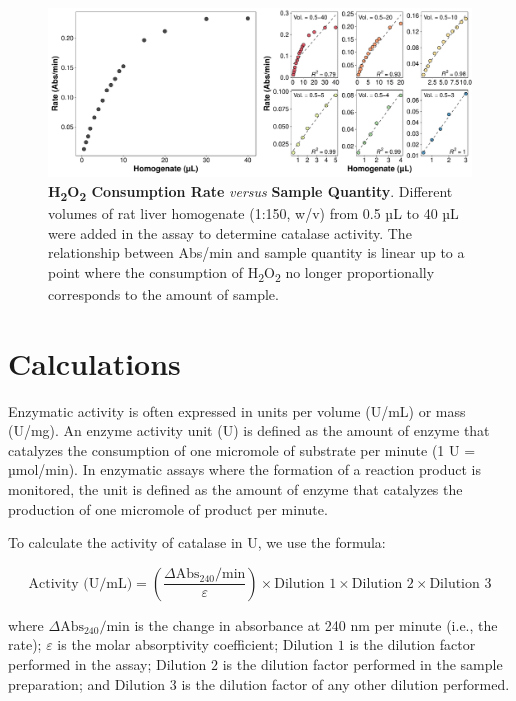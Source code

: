 \documentclass[
  9pt,
  american,
  a5paper,
  extrafontsizes,onecolumn,openright
  ]{memoir}
\newlength{\rf}
\begin{document}
\scriptsize

\begin{figure}

\includegraphics[width=1\linewidth]{Volume-1_files/figure-latex/fig-cat-linear-range-1} \hfill{}

\caption{\textbf{H\textsubscript{2}O\textsubscript{2} Consumption Rate} \emph{versus} \textbf{Sample Quantity}. Different volumes of rat liver homogenate (1:150, w/v) from 0.5 µL to 40 µL were added in the assay to determine catalase activity. The relationship between Abs/min and sample quantity is linear up to a point where the consumption of H\textsubscript{2}O\textsubscript{2} no longer proportionally corresponds to the amount of sample.}\label{fig:fig-cat-linear-range}
\end{figure}

\normalsize

\section{Calculations}\label{calculations}

Enzymatic activity is often expressed in units per volume (U/mL) or mass (U/mg). An enzyme activity unit (U) is defined as the amount of enzyme that catalyzes the consumption of one micromole of substrate per minute (1 U = µmol/min). In enzymatic assays where the formation of a reaction product is monitored, the unit is defined as the amount of enzyme that catalyzes the production of one micromole of product per minute.

To calculate the activity of catalase in U, we use the formula:

\[ 
\text{Activity (U/mL)} = \left( \frac{\Delta \text{Abs}_{240}/\text{min}}{\varepsilon} \right) \times \text{Dilution 1} \times \text{Dilution 2} \times \text{Dilution 3}
\]

where \(\Delta \text{Abs}_{240}/\text{min}\) is the change in absorbance at 240 nm per minute (i.e., the rate); \(\varepsilon\) is the molar absorptivity coefficient; \(\text{Dilution 1}\) is the dilution factor performed in the assay; \(\text{Dilution 2}\) is the dilution factor performed in the sample preparation; and \(\text{Dilution 3}\) is the dilution factor of any other dilution performed.
\end{document}
